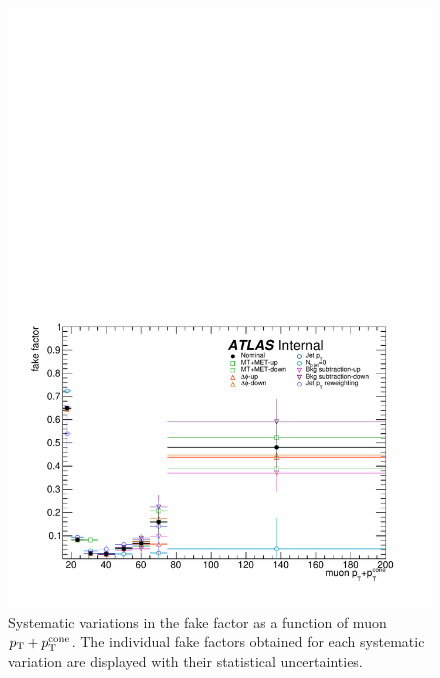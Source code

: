 \begin{figure}[htbp]
  \centering
  \includegraphics[width=.6\textwidth]{figs/ssww_13tev/backgrounds/ff/muon_ff_sys}
  \caption{Systematic variations in the fake factor as a function of muon $p_{\mathrm{T}}+p_{\mathrm{T}}^{\textrm{cone}}$.  The individual fake factors obtained for each systematic variation are displayed with their statistical uncertainties.}
  \label{fig:ssww13tev_ff_muon_sys}
\end{figure}

